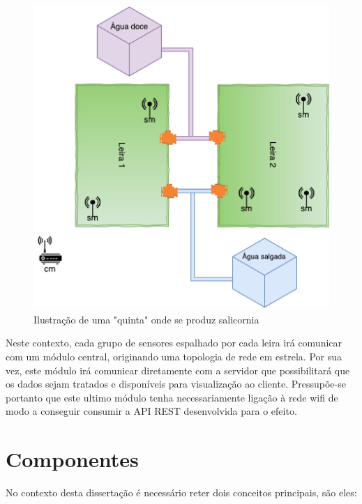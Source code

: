 \begin{figure}[!htb]
	\centering
	\includegraphics[scale=0.55]{esquemas/leiras-comm-geral.pdf}
	\caption{Ilustração de uma "quinta" onde se produz salicornia}
	\label{dikw}
\end{figure}





Neste contexto, cada grupo de sensores espalhado por cada leira irá comunicar com um módulo central, originando uma topologia de rede em estrela.  Por sua vez, este módulo irá comunicar diretamente com a servidor que possibilitará que os dados sejam tratados e disponíveis para visualização ao cliente.  Pressupõe-se portanto que este ultimo módulo tenha necessariamente ligação à rede wifi de modo a conseguir consumir a API REST desenvolvida para o efeito. 


\section{Componentes}

No contexto desta dissertação é necessário reter dois conceitos principais, são eles: 

